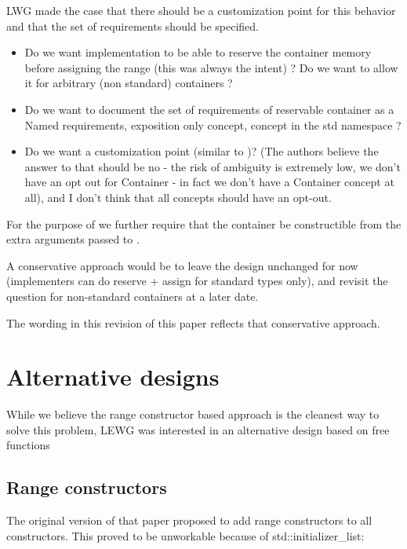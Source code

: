 \documentclass{wg21}
\begin{document}
LWG made the case that there should be a customization point for this behavior and that the set of requirements should be specified.

\begin{itemize}
\item Do we want implementation to be able to reserve the container memory before assigning the range (this was always the intent) ? Do we want to allow it for arbitrary (non standard) containers ?


\item Do we want to document the set of requirements of reservable container as a Named requirements, exposition only concept, concept in the std namespace ?
\item Do we want a customization point (similar to )? (The authors believe the answer to that should be no - the risk of ambiguity is extremely low, we don't have an opt out for Container - in fact we don't have a Container concept at all), and I don't think that all concepts should have an opt-out.
\end{itemize}

For the purpose of  we further require that the container be constructible 
from the extra arguments passed to .


A conservative approach would be to leave the design unchanged for now (implementers can do reserve + assign for standard types only), and revisit the question for non-standard containers at a later date.

The wording in this revision of this paper reflects that conservative approach.



\section{Alternative designs}

While we believe the range constructor based approach is the cleanest way to solve this problem,
LEWG was interested in an alternative design based on free functions

\subsection{Range constructors}

The original version of that paper proposed to add range constructors to all constructors.
This proved to be unworkable because of std::initializer_list:
\end{document}
